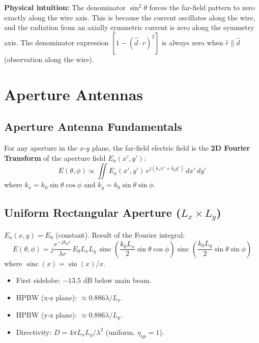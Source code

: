 \documentclass[10pt,letterpaper]{article}
\newcommand{\rhat}{\hat{r}}
\newcommand{\dhat}{\hat{d}}
\newcommand{\sinc}{\operatorname{sinc}}
\begin{document}
\textbf{Physical intuition:} The denominator $\sin^2\theta$ forces the far-field pattern to zero exactly along the wire axis. This is because the current oscillates along the wire, and the radiation from an axially symmetric current is zero along the symmetry axis. The denominator expression $[1-(\dhat\cdot\rhat)^2]$ is always zero when $\rhat\parallel\dhat$ (observation along the wire).

\section{Aperture Antennas}

\subsection{Aperture Antenna Fundamentals}

For any aperture in the $x$-$y$ plane, the far-field electric field is the \textbf{2D Fourier Transform} of the aperture field $E_a(x',y')$:
\begin{equation}
  E(\theta,\phi) \propto \iint E_a(x',y')\,e^{j(k_x x' + k_y y')}\,dx'\,dy'
\end{equation}
where $k_x = k_0\sin\theta\cos\phi$ and $k_y = k_0\sin\theta\sin\phi$.

\subsection{Uniform Rectangular Aperture ($L_x\times L_y$)}

$E_a(x,y) = E_0$ (constant). Result of the Fourier integral:
\begin{equation}
  E(\theta,\phi) = j\frac{e^{-jk_0 r}}{\lambda r}\,E_0 L_x L_y\,\sinc\!\left(\frac{k_0 L_x}{2}\sin\theta\cos\phi\right)\sinc\!\left(\frac{k_0 L_y}{2}\sin\theta\sin\phi\right)
\end{equation}
where $\sinc(x) = \sin(x)/x$.

\begin{itemize}[noitemsep]
  \item First sidelobe: $-13.5$ dB below main beam.
  \item HPBW (x-z plane): $\approx 0.886\lambda/L_x$.
  \item HPBW (y-z plane): $\approx 0.886\lambda/L_y$.
  \item Directivity: $D = 4\pi L_x L_y/\lambda^2$ (uniform, $\eta_{ap}=1$).
\end{itemize}
\end{document}
